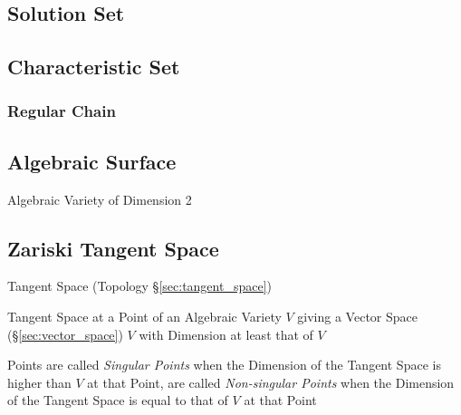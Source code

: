 \subsection{Solution Set}\label{sec:solution_set}

\subsection{Characteristic Set}\label{sec:characteristic_set}

\subsubsection{Regular Chain}\label{sec:regular_chain}



\subsection{Algebraic Surface}\label{sec:algebraic_surface}

Algebraic Variety of Dimension 2



\subsection{Zariski Tangent Space}\label{sec:zariski_space}

Tangent Space (Topology \S\ref{sec:tangent_space})

Tangent Space at a Point of an Algebraic Variety $V$ giving a Vector Space
(\S\ref{sec:vector_space}) $V$ with Dimension at least that of $V$

Points are called \emph{Singular Points} when the Dimension of the Tangent
Space is higher than $V$ at that Point, are called \emph{Non-singular Points}
when the Dimension of the Tangent Space is equal to that of $V$ at that Point



